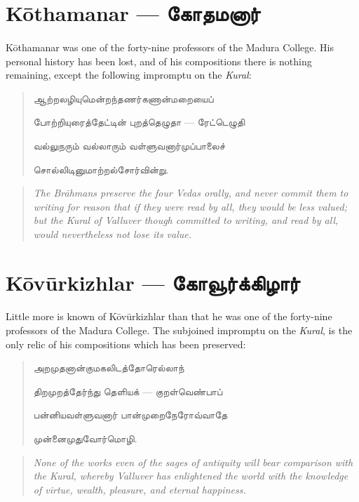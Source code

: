 \documentclass{article}
\newcommand{\TamilText}[1]{\texttamil{#1}}
\newcommand{\TamilBold}[1]{\texttamil{\textbf{#1}}}
\newcommand{\tam}[1]{\TamilText{#1}}
\newcommand{\tambold}[1]{\TamilBold{#1}}
\begin{document}
\section{K\={o}thamanar --- \tambold{கோதமனார்}}
\paragraph{}
K\={o}thamanar was one of the forty-nine professors of the Madura College. His personal history has been lost, and of his compositions there is nothing remaining, except the following impromptu on the \emph{Kural}:
\begin{quotation}\small
\tam{ஆற்றலழியுமென்றந்தணர்கணான்மறையைப்‌}

\tam{போற்றியுரைத்தேட்டின்‌ புறத்தெழுதா} --- \tam{ரேட்டெழுதி}

\tam{வல்லுநரும்‌ வல்லாரும்‌ வள்ளுவனார்முப்பாலைச்‌}

\tam{சொல்லிடினுமாற்றல்சோர்வின்று}.
\end{quotation}
\begin{quotation}\small
\emph{The Br\={a}hmans preserve the four Vedas orally, and never commit them to writing for reason that if they were read by all, they would be less valued; but the Kural of Valluver though committed to writing, and read by all, would nevertheless not lose its value.}
\end{quotation}

\section{K\={o}v\={u}rkizhlar --- \tambold{கோவூர்க்கிழார்}}
\paragraph{}
Little more is known of K\={o}v\={u}rkizhlar than that he was one of the forty-nine professors of the Madura College. The subjoined impromptu on the \emph{Kural}, is the only relic of his compositions which has been preserved:
\begin{quotation}\small
\tam{அறமுதனான்குமகலிடத்தோரெல்லாந்}

\tam{திறமுறத்தேர்ந்து தெளியக்} --- \tam{குறள்வெண்பாப்‌}

\tam{பன்னியவள்ளுவனார்‌ பான்முறைநேரோவ்வாதே}

\tam{முன்னைமுதுவோர்மொழி}.
\end{quotation}
\begin{quotation}\small
\emph{None of the works even of the sages of antiquity will bear comparison with the Kural, whereby Valluver has enlightened the world with the knowledge of virtue, wealth, pleasure, and eternal happiness.}
\end{quotation}
\end{document}
